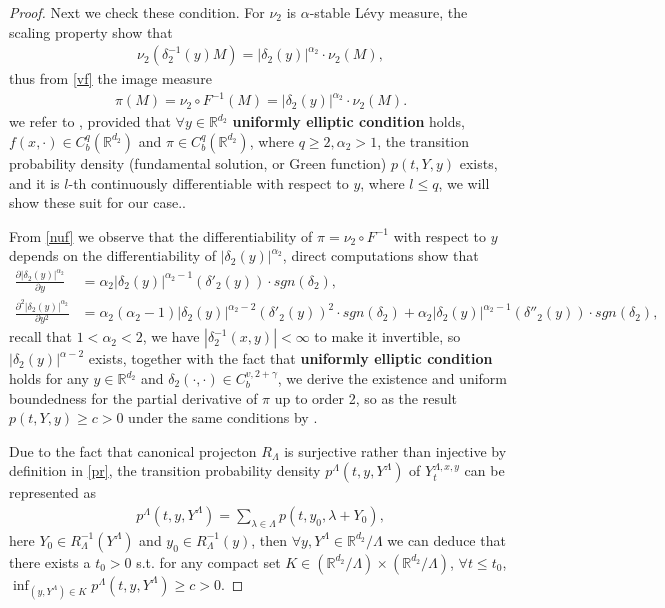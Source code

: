 \documentclass[11pt,reqno]{amsart}
\numberwithin{equation}{section}
\newcommand{\R}{\mathbb{R}}
\newcommand{\al}{\alpha}
\newcommand{\de}{\delta}
\begin{document}
\begin{proof}
 Next we check these condition.  
For $\nu_{2}$ is $\al$-stable L\'evy measure, the scaling property show that
\begin{align*}
	\nu_{2}(\de_2^{-1}(y)M)=|\de_2(y)|^{\al_{2}}\cdot\nu_{2}(M),
\end{align*}
thus from \eqref{vf} the image measure
\begin{align}\label{nuf}
\pi(M)=\nu_{2}\circ F^{-1}(M)=|\de_2(y)|^{\al_{2}}\cdot\nu_{2}(M).
\end{align}
we refer to \cite[743, Theorem 3.1]{VK}, provided that $\forall y\in \R^{d_{2}}$ \textbf{uniformly elliptic condition} holds, $f(x,\cdot)\in C^{q}_{b}(\R^{d_{2}})$ and $\pi\in C^{q}_{b}(\R^{d_{2}})$, where $q\geq2, \al_{2}>1$,  the  transition probability density (fundamental solution, or Green function) $p(t,Y,y)$ exists, and it is $l$-th continuously differentiable with respect to $y$, where $l\leq q$, we will show these suit for our case..

From \eqref{nuf} we observe that the differentiability of $\pi=\nu_{2}\circ F^{-1}$ with respect to $y$ depends on the differentiability of $|\de_2(y)|^{\al_{2}}$, direct computations show that 
\begin{align*}
	\frac{\partial |\de_2(y)|^{\al_{2}}}{\partial y}&=\al_{2} |\de_2(y)|^{\al_{2}-1}(\de'_2(y))\cdot sgn(\delta_{2}),\\
	\frac{\partial^{2} |\de_2(y)|^{\al_{2}}}{\partial y^{2}}&=\al_{2}(\al_{2}-1) |\de_2(y)|^{\al_{2}-2}(\de'_2(y))^{2}\cdot sgn(\de_2)+\alpha_{2}|\de_2(y)|^{\al_{2}-1}(\de''_2(y))\cdot sgn(\de_2),
\end{align*}
recall that $1<\alpha_{2}<2$, we have $|\delta^{-1}_{2}(x,y)|<\infty$ to make it invertible, so $|\de_2(y)|^{\al-2}$ exists, together with the fact that \textbf{uniformly elliptic condition} holds for any $ y\in \R^{d_{2}}$ and $\delta_{2}(\cdot,\cdot)\in C_{b}^{v,2+\gamma}$, we derive the existence and uniform boundedness for the partial derivative of $\pi$ up to order 2, so as the result $p(t,Y,y)\geq c>0$ under the same conditions by \cite[749, Proposition 3.4; 750, Theorem 3.2]{VK}.
\fi





Due to the fact that canonical projecton $R_{\Lambda}$ is surjective rather than injective by definition in \eqref{pr}, the transition probability density $p^{\Lambda}(t,y,Y^{\Lambda})$ of $Y_{t}^{\Lambda,x,y}$ can be represented as 
\begin{align}\label{tran}
p^{\Lambda}(t,y,Y^{\Lambda})=\sum_{\lambda\in\Lambda}p(t,y_{0},\lambda+Y_{0}),
\end{align}
 here $Y_{0}\in R_{\Lambda}^{-1}(Y^{\Lambda})$ and $y_{0}\in R_{\Lambda}^{-1}(y)$, then $\forall y,Y^{\Lambda}\in \mathbb{R}^{d_{2}}/\Lambda$ we can deduce that there exists a $t_{0}>0$ s.t. for any compact set $K\in (\mathbb{R}^{d_{2}}/\Lambda)\times(\mathbb{R}^{d_{2}}/\Lambda)$,  $\forall t\leq t_{0}$,  $\inf_{(y,Y^\Lambda)\in K }p^{\Lambda}(t,y,Y^{\Lambda})\geq c>0$.


\end{proof}
\end{document}
